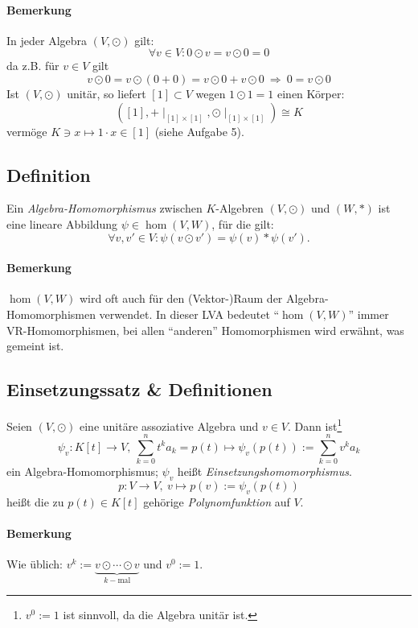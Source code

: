 \paragraph{Bemerkung}
	In jeder Algebra $ (V,\odot) $ gilt:
		\[ \forall v\in V: 0\odot v = v\odot 0 = 0 \]
	da z.B. für $ v\in V $ gilt
		\[ v\odot 0 = v\odot (0+0) = v\odot 0 + v\odot 0 \ \Rightarrow\  0=v\odot 0\]
	Ist $ (V,\odot) $ unitär, so liefert $ [1]\subset V $ wegen $ 1\odot 1 = 1 $ einen Körper:
		\[ ([1], +\mid_{[1]\times [1]},\odot\mid_{[1]\times [1]} ) \cong K \]
	vermöge $ K\ni x \mapsto 1 \cdot x\in [1] $ (siehe Aufgabe 5).
	
\subsection{Definition}
	\begin{Definition}
		Ein \emph{Algebra-Homomorphismus} zwischen $ K $-Algebren $ (V,\odot) $ und $ (W,*) $ ist eine lineare Abbildung $ \psi\in \hom(V,W) $, für die gilt:
		\[ \forall v,v' \in V: \psi(v\odot v')=\psi(v)*\psi(v'). \]
	\end{Definition}
\paragraph{Bemerkung}
	$ \hom(V,W) $ wird oft auch für den (Vektor-)Raum der Algebra-Homomorphismen verwendet. In dieser LVA bedeutet "`$ \hom(V,W) $"' immer VR-Homomorphismen, bei allen "`anderen"' Homomorphismen wird  erwähnt, was gemeint ist.


\subsection{Einsetzungssatz \& Definitionen}
	\begin{Satz}[Einsetzungssatz]
		Seien $ (V,\odot) $ eine unitäre assoziative Algebra und $ v\in V $. Dann ist\footnote{$ v^0 := 1 $ ist sinnvoll, da die Algebra unitär ist.}
			\[ \psi_v: K[t]\to V,\ \sum_{k=0}^{n}t^ka_k = p(t)\mapsto \psi_v(p(t)) := \sum_{k=0}^{n}v^ka_k \]
		ein Algebra-Homomorphismus; $ \psi_v $ heißt \emph{Einsetzungshomomorphismus}. 
			\[ p:V\to V,\ v\mapsto p(v) := \psi_v(p(t)) \]
		heißt die zu $ p(t)\in K[t] $ gehörige \emph{Polynomfunktion} auf $ V $.
	\end{Satz}
\paragraph{Bemerkung}
	Wie üblich: $ v^k := \underset{k-\text{mal}}{\underbrace{v\odot\cdots \odot v}} $ und $ v^0 := 1 $.
